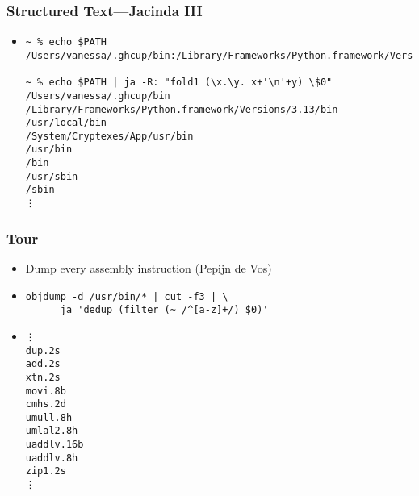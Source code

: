 \documentclass{beamer}
\begin{document}
\begin{frame}[fragile]
  \frametitle{Structured Text---Jacinda III}
  \begin{itemize}
    \item
      \begin{verbatim}
~ % echo $PATH
/Users/vanessa/.ghcup/bin:/Library/Frameworks/Python.framework/Versions/3.13/bin:/Library/Frameworks/Python.framework/Versions/3.12/bin:/Library/Frameworks/Python.framework/Versions/3.11/bin:/Library/Frameworks/Python.framework/Versions/3.10/bin:/usr/local/bin:/System/Cryptexes/App/usr/bin:/usr/bin:/bin:/usr/sbin:/sbin:/var/run/com.apple.security.cryptexd/codex.system/bootstrap/usr/local/bin:/var/run/com.apple.security.cryptexd/codex.system/bootstrap/usr/bin:/var/run/com.apple.security.cryptexd/codex.system/bootstrap/usr/appleinternal/bin:/opt/X11/bin:/Library/TeX/texbin:/usr/local/go/bin:/Users/vanessa/.cpm/bin:/Users/vanessa/pakcs/bin:/Users/vanessa/.local/bin:/Users/vanessa/.cargo/bin:/Applications/iTerm.app/Contents/Resources/utilities:/Applications/CMake.app/Contents/bin:/Users/vanessa/.fzf/bin

~ % echo $PATH | ja -R: "fold1 (\x.\y. x+'\n'+y) \$0"
/Users/vanessa/.ghcup/bin
/Library/Frameworks/Python.framework/Versions/3.13/bin
/usr/local/bin
/System/Cryptexes/App/usr/bin
/usr/bin
/bin
/usr/sbin
/sbin
⋮
      \end{verbatim}
  \end{itemize}
\end{frame}


\begin{frame}[fragile]
  \frametitle{Tour}
  \begin{itemize}
    \item Dump every assembly instruction (Pepijn de Vos)
    \item 
      \begin{verbatim}
objdump -d /usr/bin/* | cut -f3 | \
      ja 'dedup (filter (~ /^[a-z]+/) $0)'
      \end{verbatim}
    \item
      \begin{verbatim}
⋮
dup.2s
add.2s
xtn.2s
movi.8b
cmhs.2d
umull.8h
umlal2.8h
uaddlv.16b
uaddlv.8h
zip1.2s
⋮
      \end{verbatim}
  \end{itemize}
\end{frame}
\end{document}
